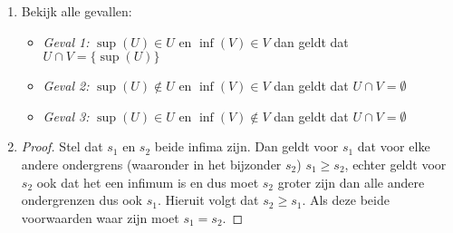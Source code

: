 \documentclass{article}
\newcommand{\f}[2]{\frac{#1}{#2}}
\newcommand{\tx}[1]{\text{#1}}
\newcommand{\en}{\tx{ en }}
\begin{document}
\begin{enumerate}[label=\arabic*]
\begin{enumerate}[label=\alph*)]
\begin{enumerate}
\begin{itemize}
\begin{proof}
                                            Nu moeten we nog laten zien dat het de grootste ondergrens is.
                                            Voor alle $\epsilon > 0$, bestaat er een $x \in Y$ zodanig dat:
                                            \[\epsilon + \underbrace{1}_{\tx{Onze claim } i = 1} > x \]
                                            neem $x = 1 + \f{1}{n+1}$, dan:
                                            \[\epsilon + 1 > \f{1}{n+1} + 1\]
                                            We kunnen epsilon willekeurig klein maken en met name $\epsilon > \f{1}{n+1}$,
                                            en dus volgt dat $i = 1$ inderdaad het infimum is.
                                        \end{proof}
                                  \item Bekijk of $Y$ een supremum heeft:
                                        \begin{proof}
                                            Claim dat het supremum $s = 2$.
                                            Bekijk $x \in 1 + \f{1}{n+1}$, we kunnen dit zien als
                                            een strikt dalende functie en dus geldt voor $n=0$, dat
                                            dit de grootste waarde is voor $1 + \f{1}{n+1}$.
                                            En dus $1 + \f{1}{0+1} = 2$. Dit betekent dus dat $2$ het maximum van $Y$ is en dus
                                            automatisch het supremum.
                                        \end{proof}
                              \end{itemize}
                    \end{enumerate}
          \end{enumerate}
    \item Bekijk alle gevallen:
          \begin{itemize}
              \item \emph{Geval 1:} $\sup(U) \in U \en \inf(V) \in V$ dan geldt dat $U \cap V = \{\sup(U)\}$
              \item \emph{Geval 2:} $\sup(U) \notin U \en \inf(V) \in V$ dan geldt dat $U \cap V = \emptyset$
              \item \emph{Geval 3:} $\sup(U) \in U \en \inf(V) \notin V$ dan geldt dat $U \cap V = \emptyset$
          \end{itemize}
    \item
          \begin{proof}
              Stel dat $s_1 \en s_2$ beide infima zijn. Dan geldt voor $s_1$ dat voor elke andere ondergrens
              (waaronder in het bijzonder $s_2$)
              $s_1 \geq s_2$, echter geldt voor $s_2$ ook dat het een infimum is en dus
              moet $s_2$ groter zijn dan alle andere ondergrenzen dus ook $s_1$. Hieruit volgt dat $s_2 \geq s_1$.
              Als deze beide voorwaarden waar zijn moet $s_1 = s_2$.
          \end{proof}

\end{enumerate}
\end{document}
